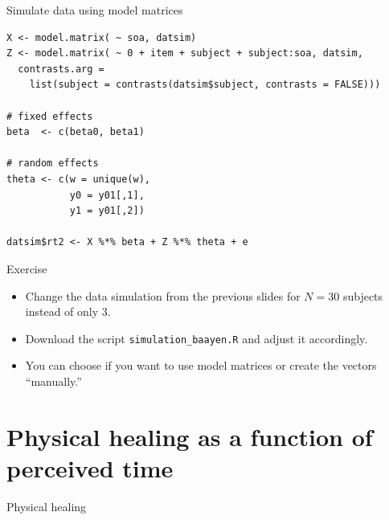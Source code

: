 \documentclass[aspectratio=169]{beamer}
\begin{document}
\begin{frame}[fragile]{Simulate data using model matrices}
  \begin{lstlisting}
X <- model.matrix( ~ soa, datsim)
Z <- model.matrix( ~ 0 + item + subject + subject:soa, datsim,
  contrasts.arg = 
    list(subject = contrasts(datsim$subject, contrasts = FALSE)))

# fixed effects
beta  <- c(beta0, beta1)

# random effects
theta <- c(w = unique(w),
           y0 = y01[,1],
           y1 = y01[,2])

datsim$rt2 <- X %*% beta + Z %*% theta + e
  \end{lstlisting}
\end{frame}

\begin{frame}[fragile]{}
  \begin{block}{Exercise}
    \begin{itemize}
      \item Change the data simulation from the previous slides for $N =
        30$ subjects instead of only 3.
      \item Download the script \verb+simulation_baayen.R+ and adjust it
        accordingly.
      \item You can choose if you want to use model matrices or create
        the vectors ``manually.''
    \end{itemize}
  \end{block}
  \nocite{Wickelmaier2022}
\end{frame}

\section[Physical healing]{Physical healing as a function of perceived time}

\begin{frame}{Physical healing \citep{Aungle2023}}

\end{frame}
\end{document}
